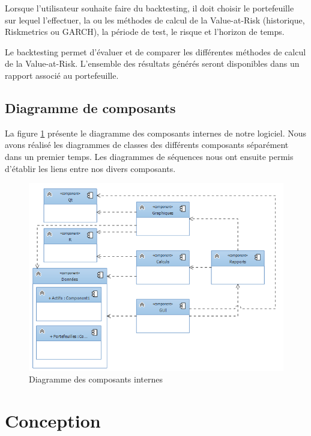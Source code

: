 \documentclass[a4paper,titlepage,french]{report}
\begin{document}
Lorsque l’utilisateur souhaite faire du backtesting, il doit choisir le portefeuille sur lequel l’effectuer, la ou les méthodes de calcul de la Value-at-Risk (historique, Riskmetrics ou GARCH), la période de test, le risque et l’horizon de temps.

Le backtesting permet d'évaluer et de comparer les différentes méthodes de calcul de la Value-at-Risk.
L'ensemble des résultats générés seront disponibles dans un rapport associé au portefeuille.


\section{Diagramme de composants}

La figure \ref{fig:diagramme-composants} présente le diagramme des composants internes de notre logiciel.
Nous avons réalisé les diagrammes de classes des différents composants séparément dans un premier temps.
Les diagrammes de séquences nous ont ensuite permis d'établir les liens entre nos divers composants.


\begin{figure}
  	\center
  	\includegraphics[width=1\textwidth]{architecture_generale.png}
  	\caption{Diagramme des composants internes}
  	\label{fig:diagramme-composants}
\end{figure}



\chapter{Conception}
\end{document}
